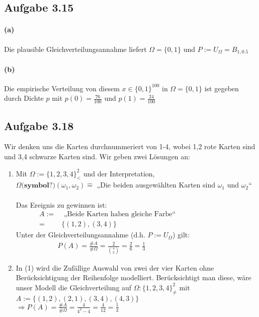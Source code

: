 \documentclass[10pt, a4paper]{article}
\begin{document}
\subsection{Aufgabe 3.15}
\paragraph{(a)}
Die plausible Gleichverteilungsannahme liefert $\Omega=\{0,1\}$ und $P:=U_{\Omega}=B_{1,0.5}$

\paragraph{(b)} Die empirische Verteilung von diesem $x\in\{0,1\}^{100}$ in $\Omega=\{0,1\}$ ist gegeben durch Dichte $p$ mit $p(0)=\frac{76}{100}$ und $p(1)=\frac{24}{100}$


\subsection{Aufgabe 3.18}Wir denken uns die Karten durchnummeriert von 1-4, wobei 1,2 rote Karten sind und 3,4 schwarze Karten sind.
Wir geben zwei Lösungen an:
\begin{enumerate}
	\item Mit $\Omega:=\{1,2,3,4\}^{2}_{<}$ und der Interpretation,	\\
	$\Omega \textbf{(symbol?)}(\omega_{1},\omega_{2})\hat{=}$ „Die beiden ausgewählten Karten sind $\omega_{1}$ und $\omega_{2}$“	\\ \\
	Das Ereignis zu gewinnen ist:
	\begin{align*}
		A:=&\text{ „Beide Karten haben gleiche Farbe“}	\hspace{100pt}\\
		=&\{(1,2),(3,4)\}
	\end{align*}
	Unter der Gleichverteilungsannahme (d.h. $P:=U_{\Omega}$) gilt:
	\begin{align*}
		P(A)=\frac{\#A}{\#\Omega}=\frac{2}{\binom{4}{2}}=\frac{2}{6}=\frac{1}{3}	\hspace{120pt}
	\end{align*}
	
	\item In (1) wird die Zufällige Auswahl von zwei der vier Karten ohne Berücksichtigung der Reihenfolge modelliert. Berücksichtigt man diese, wäre unser Modell die Gleichverteilung auf  $\Omega:\{1,2,3,4\}^{2}_{\neq}$ mit $A:=\{(1,2),(2,1),(3,4),(4,3)\}$	\\
	$\Rightarrow P(A)=\frac{\#A}{\#\Omega}=\frac{4}{4^{2}-4}=\frac{4}{12}=\frac{1}{3}$
\end{enumerate}
\end{document}
